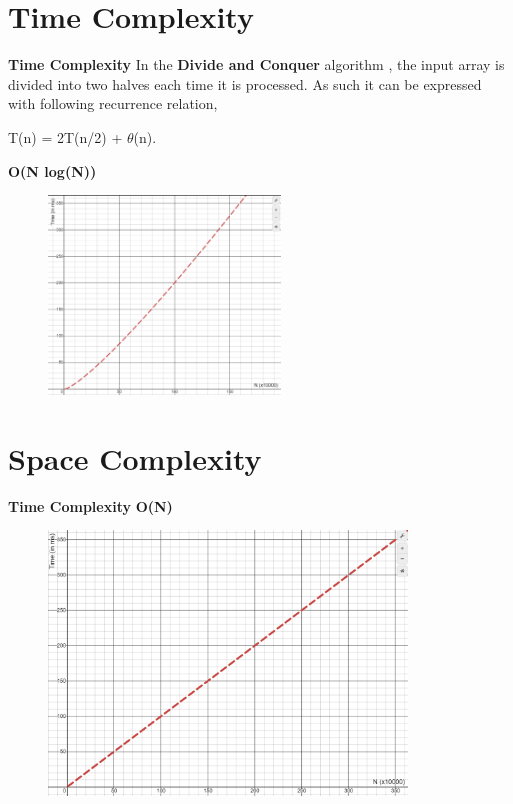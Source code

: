 \documentclass{beamer}
\begin{document}
\section{Time Complexity}
\begin{frame}{\textbf{Time Complexity}}
In the \textbf{Divide and Conquer} algorithm , the input array is divided into two halves each time it is processed.
As such it can be expressed with following recurrence relation,
\begin{center} T(n) = 2T(n/2) + $\theta$(n).\end{center}
    \textbf{O(N log(N))}
    \begin{figure}[htbp]
     \includegraphics[width=0.55\textwidth]{timeComplexity.png}\\
\end{figure}
    
\end{frame}


\section{Space Complexity}
\begin{frame}{\textbf{Time Complexity}}
    \textbf{O(N)}
    \begin{figure}[htbp]
     \includegraphics[width=0.85\textwidth]{spaceComplexity.png}\\
\end{figure}
    
\end{frame}
\end{document}
